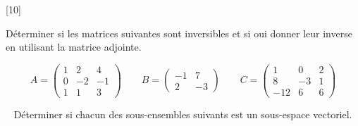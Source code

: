 \documentclass[letter,12pt]{exam}
\newcommand{\RR}{\mathbb{R}}
\begin{document}
\begin{questions}
	\vspace*{.5cm}
	[10] ~
	
	Déterminer si les matrices suivantes sont inversibles et si oui donner leur inverse en utilisant la matrice adjointe. 
	
	$$A=\left(\begin{array}{rrr}
	1 & 2 & 4 \\
	0 & -2 & -1 \\
	1 & 1 & 3
	\end{array}\right) \qquad B=\left(\begin{array}{rr}
	-1 & 7 \\
	2 & -3
	\end{array}\right)
	 \qquad C=\left(\begin{array}{rrr}
	 1 & 0 & 2 \\
	 8 & -3 & 1 \\
	 -12 & 6 & 6
	 \end{array}\right)
	 $$
	
	\begin{solutionorbox}
	\end{solutionorbox}
	
	\vspace*{.5cm}
	 ~
	Déterminer si chacun des sous-ensembles suivants est un sous-espace vectoriel. 
	
\end{questions}
\end{document}
